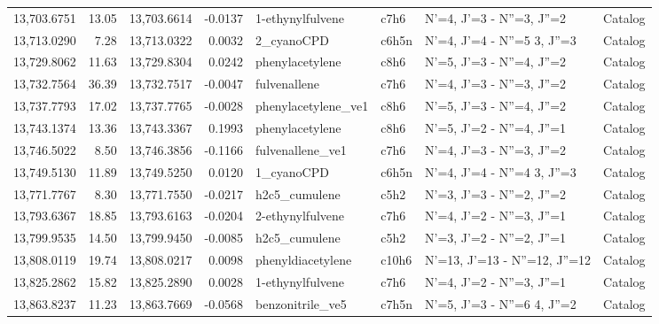 \begin{longtable}{rrrrllll}
13,703.6751 &     13.05 &       13,703.6614 &   -0.0137 &            1-ethynylfulvene &    c7h6 &            N'=4, J'=3 - N''=3, J''=2 &    Catalog \\
13,713.0290 &      7.28 &       13,713.0322 &    0.0032 &                  2_cyanoCPD &   c6h5n &      N'=4, J'=4 - N''=5     3, J''=3 &    Catalog \\
13,729.8062 &     11.63 &       13,729.8304 &    0.0242 &             phenylacetylene &    c8h6 &            N'=5, J'=3 - N''=4, J''=2 &    Catalog \\
13,732.7564 &     36.39 &       13,732.7517 &   -0.0047 &                fulvenallene &    c7h6 &            N'=4, J'=3 - N''=3, J''=2 &    Catalog \\
13,737.7793 &     17.02 &       13,737.7765 &   -0.0028 &         phenylacetylene_ve1 &    c8h6 &            N'=5, J'=3 - N''=4, J''=2 &    Catalog \\
13,743.1374 &     13.36 &       13,743.3367 &    0.1993 &             phenylacetylene &    c8h6 &            N'=5, J'=2 - N''=4, J''=1 &    Catalog \\
13,746.5022 &      8.50 &       13,746.3856 &   -0.1166 &            fulvenallene_ve1 &    c7h6 &            N'=4, J'=3 - N''=3, J''=2 &    Catalog \\
13,749.5130 &     11.89 &       13,749.5250 &    0.0120 &                  1_cyanoCPD &   c6h5n &      N'=4, J'=4 - N''=4     3, J''=3 &    Catalog \\
13,771.7767 &      8.30 &       13,771.7550 &   -0.0217 &               h2c5_cumulene &    c5h2 &            N'=3, J'=3 - N''=2, J''=2 &    Catalog \\
13,793.6367 &     18.85 &       13,793.6163 &   -0.0204 &            2-ethynylfulvene &    c7h6 &            N'=4, J'=2 - N''=3, J''=1 &    Catalog \\
13,799.9535 &     14.50 &       13,799.9450 &   -0.0085 &               h2c5_cumulene &    c5h2 &            N'=3, J'=2 - N''=2, J''=1 &    Catalog \\
13,808.0119 &     19.74 &       13,808.0217 &    0.0098 &           phenyldiacetylene &   c10h6 &        N'=13, J'=13 - N''=12, J''=12 &    Catalog \\
13,825.2862 &     15.82 &       13,825.2890 &    0.0028 &            1-ethynylfulvene &    c7h6 &            N'=4, J'=2 - N''=3, J''=1 &    Catalog \\
13,863.8237 &     11.23 &       13,863.7669 &   -0.0568 &            benzonitrile_ve5 &   c7h5n &      N'=5, J'=3 - N''=6     4, J''=2 &    Catalog \\

\end{longtable}
